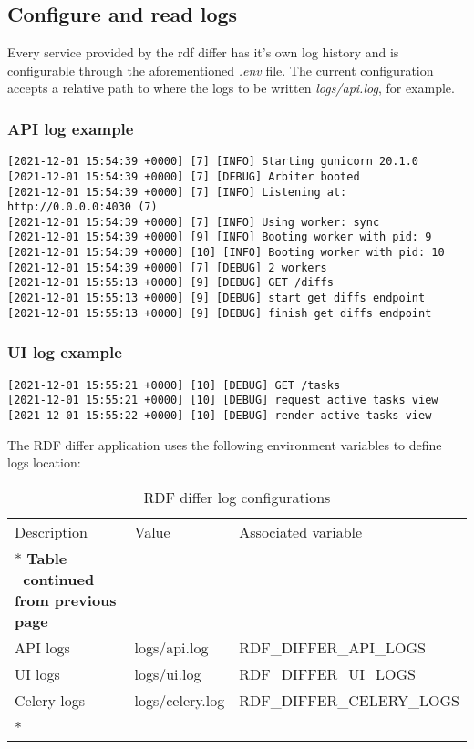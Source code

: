 \subsection{Configure and read logs}
Every service provided by the rdf differ has it's own log history and is configurable through the aforementioned \textit{.env} file. The current configuration accepts a relative path to where the logs to be written \textit{logs/api.log}, for example.

\subsubsection{API log example}
\begin{lstlisting}
[2021-12-01 15:54:39 +0000] [7] [INFO] Starting gunicorn 20.1.0
[2021-12-01 15:54:39 +0000] [7] [DEBUG] Arbiter booted
[2021-12-01 15:54:39 +0000] [7] [INFO] Listening at: http://0.0.0.0:4030 (7)
[2021-12-01 15:54:39 +0000] [7] [INFO] Using worker: sync
[2021-12-01 15:54:39 +0000] [9] [INFO] Booting worker with pid: 9
[2021-12-01 15:54:39 +0000] [10] [INFO] Booting worker with pid: 10
[2021-12-01 15:54:39 +0000] [7] [DEBUG] 2 workers
[2021-12-01 15:55:13 +0000] [9] [DEBUG] GET /diffs
[2021-12-01 15:55:13 +0000] [9] [DEBUG] start get diffs endpoint
[2021-12-01 15:55:13 +0000] [9] [DEBUG] finish get diffs endpoint
\end{lstlisting}

\subsubsection{UI log example}
\begin{lstlisting}
[2021-12-01 15:55:21 +0000] [10] [DEBUG] GET /tasks
[2021-12-01 15:55:21 +0000] [10] [DEBUG] request active tasks view
[2021-12-01 15:55:22 +0000] [10] [DEBUG] render active tasks view
\end{lstlisting}

The RDF differ application uses the following environment variables to define logs location:

\begin{longtable}[c]{@{}p{3.5cm}p{3.5cm}l@{}}
	\toprule
	Description & Value           & Associated variable         \\* \midrule
	\endfirsthead
	\multicolumn{3}{c}%
	{{\bfseries Table \thetable\ continued from previous page}} \\
	\endhead
	\bottomrule
	\endfoot
	\endlastfoot
	API logs    & logs/api.log    & RDF\_DIFFER\_API\_LOGS      \\
	UI logs     & logs/ui.log     & RDF\_DIFFER\_UI\_LOGS       \\
	Celery logs & logs/celery.log & RDF\_DIFFER\_CELERY\_LOGS   \\* \bottomrule
	\caption{RDF differ log configurations}
	\label{tab:rdf-differ-log}                                  \\
\end{longtable}
